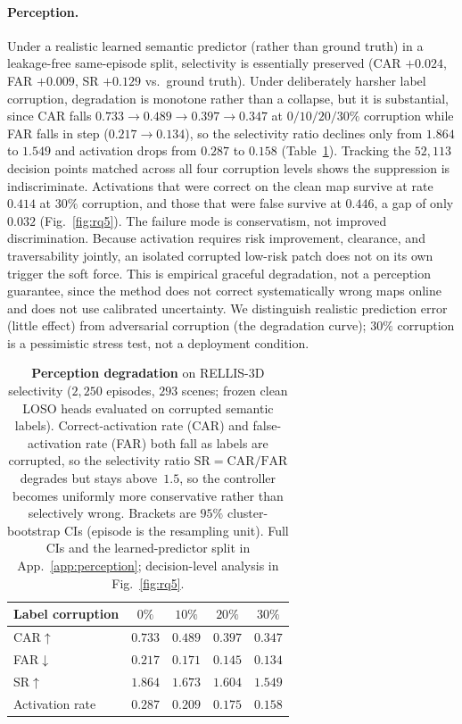 \paragraph{Perception.}
Under a realistic learned semantic predictor (rather than ground truth) in a leakage-free same-episode split, selectivity is essentially preserved (CAR $+0.024$, FAR $+0.009$, SR $+0.129$ vs.\ ground truth). Under deliberately harsher label corruption, degradation is monotone rather than a collapse, but it is substantial, since CAR falls $0.733\!\to\!0.489\!\to\!0.397\!\to\!0.347$ at $0/10/20/30\%$ corruption while FAR falls in step ($0.217\!\to\!0.134$), so the selectivity ratio declines only from $1.864$ to $1.549$ and activation drops from $0.287$ to $0.158$ (Table~\ref{tab:perception}). Tracking the $52{,}113$ decision points matched across all four corruption levels shows the suppression is indiscriminate. Activations that were correct on the clean map survive at rate $0.414$ at $30\%$ corruption, and those that were false survive at $0.446$, a gap of only $0.032$ (Fig.~\ref{fig:rq5}). The failure mode is conservatism, not improved discrimination. Because activation requires risk improvement, clearance, and traversability jointly, an isolated corrupted low-risk patch does not on its own trigger the soft force. This is empirical graceful degradation, not a perception guarantee, since the method does not correct systematically wrong maps online and does not use calibrated uncertainty. We distinguish realistic prediction error (little effect) from adversarial corruption (the degradation curve); $30\%$ corruption is a pessimistic stress test, not a deployment condition.

\begin{table}[t]
\centering
\caption{\textbf{Perception degradation} on RELLIS-3D selectivity
($2{,}250$ episodes, $293$ scenes; frozen clean LOSO heads evaluated on
corrupted semantic labels). Correct-activation rate (CAR) and false-activation
rate (FAR) both fall as labels are corrupted, so the selectivity ratio
$\mathrm{SR}=\mathrm{CAR}/\mathrm{FAR}$ degrades but stays above~$1.5$, so the
controller becomes uniformly more conservative rather than selectively wrong.
Brackets are $95\%$ cluster-bootstrap CIs (episode is the resampling unit).
Full CIs and the learned-predictor split in App.~\ref{app:perception};
decision-level analysis in Fig.~\ref{fig:rq5}.}
\label{tab:perception}
\small
\setlength{\tabcolsep}{5pt}\renewcommand{\arraystretch}{1.1}
\begin{tabular}{lcccc}
\toprule
Label corruption & $0\%$ & $10\%$ & $20\%$ & $30\%$ \\
\midrule
CAR$\uparrow$ & $0.733$ & $0.489$ & $0.397$ & $0.347$ \\
FAR$\downarrow$ & $0.217$ & $0.171$ & $0.145$ & $0.134$ \\
SR$\uparrow$ & $1.864$ & $1.673$ & $1.604$ & $1.549$ \\
Activation rate & $0.287$ & $0.209$ & $0.175$ & $0.158$ \\
\bottomrule
\end{tabular}
\end{table}

